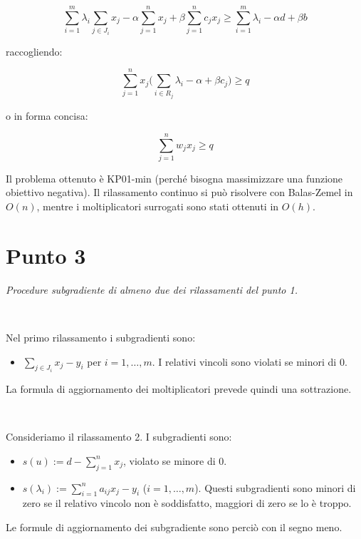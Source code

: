 \documentclass[11pt]{book}
\begin{document}
$$
\sum\limits_{i=1}^m \lambda_i \sum\limits_{j \in J_i} x_j -
\alpha\sum\limits_{j=1}^n x_j + \beta \sum\limits_{j=1}^n c_jx_j 
\geq
\sum\limits_{i=1}^m \lambda_i - \alpha d + \beta b
$$

raccogliendo:

$$
\sum\limits_{j=1}^n x_j \Bigr ( \sum\limits_{i \in R_j} \lambda_i - \alpha +
\beta c_j \Bigr ) \geq q
$$

o in forma concisa:

$$
\sum\limits_{j=1}^n w_jx_j \geq q
$$

Il problema ottenuto \`e KP01-min (perch\'e bisogna massimizzare una
funzione obiettivo negativa). Il rilassamento continuo si pu\`o
risolvere con Balas-Zemel in $O(n)$, mentre i moltiplicatori surrogati
sono stati ottenuti in $O(h)$.

\section*{Punto 3}

\textit{Procedure subgradiente di almeno due dei rilassamenti del
  punto 1.}

\

Nel primo rilassamento i subgradienti sono:

\begin{itemize}
\item $\sum\limits_{j \in J_i} x_j - y_i$  per $i=1,\dots,m$. I relativi
  vincoli sono violati se minori di 0.
\end{itemize}

La formula di aggiornamento dei moltiplicatori prevede quindi una
sottrazione.

\

Consideriamo il rilassamento 2. I subgradienti sono:

\begin{itemize}
\item $s(u) := d-\sum\limits_{j=1}^nx_j$, violato se minore di 0.
\item $s(\lambda_i) := \sum\limits_{i=1}^n a_{ij}x_j - y_i$
  ($i=1,\dots,m$). Questi subgradienti sono minori di zero se il
  relativo vincolo non \`e soddisfatto, maggiori di zero se lo \`e
  troppo.
\end{itemize}


Le formule di aggiornamento dei subgradiente sono perci\`o con il
segno meno.
\end{document}
